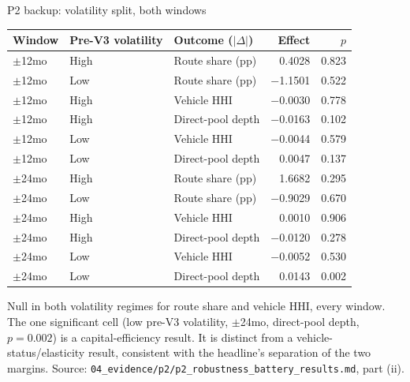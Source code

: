 \documentclass[aspectratio=169]{beamer}
\begin{document}
\begin{frame}{P2 backup: volatility split, both windows}
  \footnotesize
  \begin{center}
  \begin{tabular}{@{}l l l r r@{}}
    \toprule
    Window & Pre-V3 volatility & Outcome ($|\Delta|$) & Effect & $p$ \\
    \midrule
    $\pm$12mo & High & Route share (pp) & 0.4028 & 0.823 \\
    $\pm$12mo & Low  & Route share (pp) & $-$1.1501 & 0.522 \\
    $\pm$12mo & High & Vehicle HHI & $-$0.0030 & 0.778 \\
    $\pm$12mo & High & Direct-pool depth & $-$0.0163 & 0.102 \\
    $\pm$12mo & Low  & Vehicle HHI & $-$0.0044 & 0.579 \\
    $\pm$12mo & Low  & Direct-pool depth & 0.0047 & 0.137 \\
    $\pm$24mo & High & Route share (pp) & 1.6682 & 0.295 \\
    $\pm$24mo & Low  & Route share (pp) & $-$0.9029 & 0.670 \\
    $\pm$24mo & High & Vehicle HHI & 0.0010 & 0.906 \\
    $\pm$24mo & High & Direct-pool depth & $-$0.0120 & 0.278 \\
    $\pm$24mo & Low  & Vehicle HHI & $-$0.0052 & 0.530 \\
    $\pm$24mo & Low  & Direct-pool depth & 0.0143 & 0.002 \\
    \bottomrule
  \end{tabular}
  \end{center}
  \vspace{0.4em}
  Null in both volatility regimes for route share and vehicle HHI, every window. The one significant cell (low pre-V3 volatility, $\pm$24mo, direct-pool depth, $p=0.002$) is a capital-efficiency result. It is distinct from a vehicle-status/elasticity result, consistent with the headline's separation of the two margins.
  {\scriptsize Source: \texttt{04\_evidence/p2/p2\_robustness\_battery\_results.md}, part (ii).}
\end{frame}
\end{document}

